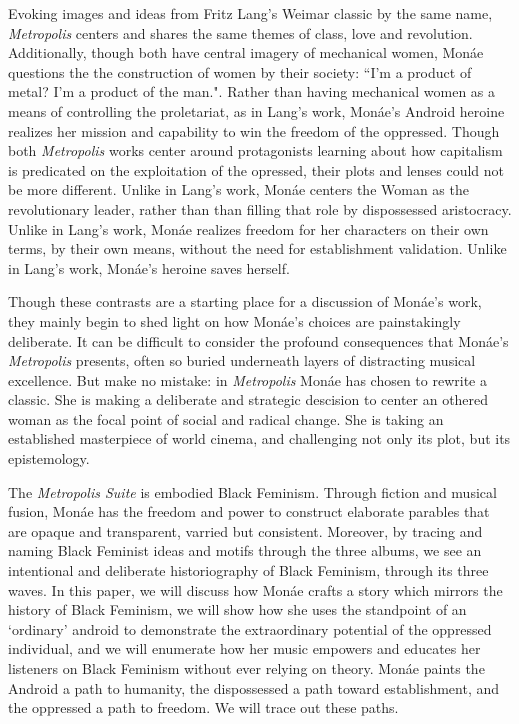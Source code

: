 \documentclass[a4paper, 11pt]{article} %
\begin{document}
Evoking images and ideas from Fritz Lang's Weimar classic by the same name, \emph{Metropolis} centers and shares the same themes of class, love and revolution\cite{metropolis}.
Additionally, though both have central imagery of mechanical women, Mon\'ae questions the the construction of women by their society: ``I'm a product of metal? I'm a product of the man."\cite{happyhunting}. 
Rather than having mechanical women as a means of controlling the proletariat, as in Lang's work\cite{metropolis}, Mon\'ae's Android heroine realizes her mission and capability to win the freedom of the oppressed.
Though both \emph{Metropolis} works center around protagonists learning about how capitalism is predicated on the exploitation of the opressed, their plots and lenses could not be more different.
Unlike in Lang's work, Mon\'ae centers the Woman as the revolutionary leader, rather than than filling that role by dispossessed aristocracy.
Unlike in Lang's work, Mon\'ae realizes freedom for her characters on their own terms, by their own means, without the need for establishment validation.
Unlike in Lang's work, Mon\'ae's heroine saves herself.

Though these contrasts are a starting place for a discussion of Mon\'ae's work, they mainly begin to shed light on how Mon\'ae's choices are painstakingly deliberate.
It can be difficult to consider the profound consequences that Mon\'ae's \emph{Metropolis} presents, often so buried underneath layers of distracting musical excellence.
But make no mistake: in \emph{Metropolis} Mon\'ae has chosen to rewrite a classic.
She is making a deliberate and strategic descision to center an othered woman as the focal point of social and radical change.
She is taking an established masterpiece of world cinema, and challenging not only its plot, but its epistemology.

The \emph{Metropolis Suite} is embodied Black Feminism.
Through fiction and musical fusion, Mon\'ae has the freedom and power to construct elaborate parables that are opaque and transparent, varried but consistent.
Moreover, by tracing and naming Black Feminist ideas and motifs through the three albums, we see an intentional and deliberate historiography of Black Feminism, through its three waves.
In this paper, we will discuss how Mon\'ae crafts a story which mirrors the history of Black Feminism, we will show how she uses the standpoint of an `ordinary' android to demonstrate the extraordinary potential of the oppressed individual, and we will enumerate how her music empowers and educates her listeners on Black Feminism without ever relying on theory.
Mon\'ae paints the Android a path to humanity, the dispossessed a path toward establishment, and the oppressed a path to freedom.
We will trace out these paths. 
\end{document}
